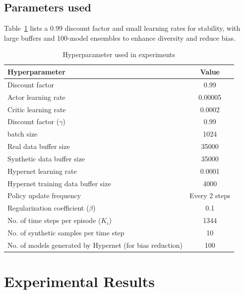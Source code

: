 \documentclass{article}
\begin{document}
\subsection{Parameters used}

Table~\ref{tab:hyperparams} lists a 0.99 discount factor and small learning rates for stability, with large buffers and 100-model ensembles to enhance diversity and reduce bias.

\begin{table}[H]
\centering
\caption{Hyperparameter used in experiments}
\label{tab:hyperparams}
\begin{tabular}{|l|c|}
\hline
\textbf{Hyperparameter} & \textbf{Value} \\
\hline
Discount factor & 0.99 \\
Actor learning rate & 0.00005 \\
Critic learning rate & 0.0002 \\
Discount factor ($\gamma$) & 0.99 \\
batch size &  1024 \\
Real data buffer size & 35000 \\
Synthetic data buffer size & 35000 \\
Hypernet learning rate & 0.0001 \\
Hypernet training data buffer size & 4000 \\
Policy update frequency & Every 2 steps \\
Regularization coefficient ($\beta$) & 0.1 \\
No. of time steps per episode ($K_i$) & 1344 \\
No. of synthetic samples per time step & 10 \\
No. of models generated by Hypernet (for bias reduction) & 100 \\
\hline
\end{tabular}
\end{table}



\section{Experimental Results}
\end{document}
